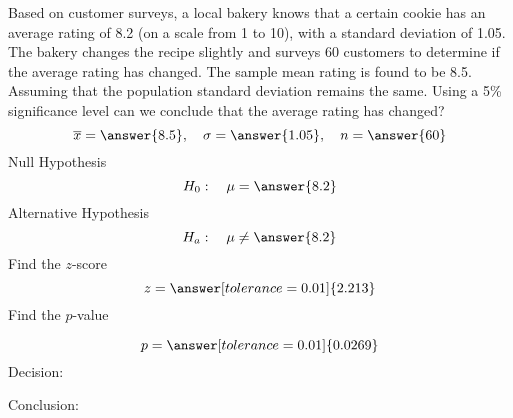 \documentclass{ximera}
\begin{document}
\begin{problem}\label{prob:140quiz11prob2}
Based on customer surveys, a local bakery knows that a certain cookie has an average rating of 8.2 (on a scale from 1 to 10), with a standard deviation of 1.05.  The bakery changes the recipe slightly and  surveys 60 customers to determine if the average rating has changed.  The sample mean rating is found to be 8.5. Assuming that the population standard deviation remains the same. Using a 5\% significance level can we conclude that the average rating has changed?
$$\overline{x}=\answer{8.5},\quad \sigma=\answer{1.05},\quad n=\answer{60}$$
Null Hypothesis
$$H_0:\quad \mu=\answer{8.2}$$
Alternative Hypothesis
$$H_a:\quad \mu\neq\answer{8.2}$$
Find the $z$-score
$$z=\answer[tolerance=0.01]{2.213}$$
Find the $p$-value
\begin{center}  
\end{center}
$$p=\answer[tolerance=0.01]{0.0269}$$
Decision:

\begin{multipleChoice} 
\end{multipleChoice}  

Conclusion:

\begin{multipleChoice} 
\end{multipleChoice} 

\end{problem}
\end{document}
